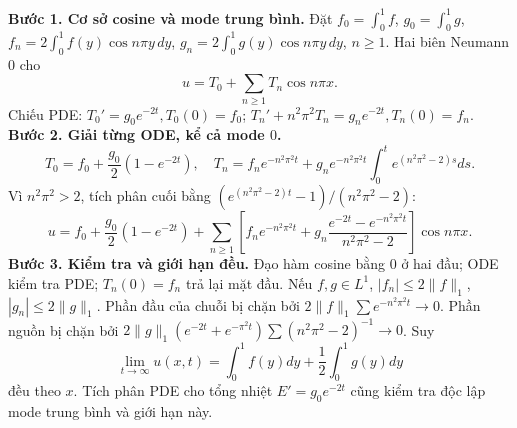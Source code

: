 \textbf{Bước 1. Cơ sở cosine và mode trung bình.}
Đặt $f_0=\int_0^1f$, $g_0=\int_0^1g$, $f_n=2\int_0^1f(y)\cos n\pi y\,dy$, $g_n=2\int_0^1g(y)\cos n\pi y\,dy$, $n\ge1$. Hai biên Neumann $0$ cho
\[u=T_0+\sum_{n\ge1}T_n\cos n\pi x.\]
Chiếu PDE: $T_0'=g_0e^{-2t},T_0(0)=f_0$; $T_n'+n^2\pi^2T_n=g_ne^{-2t},T_n(0)=f_n$.
\textbf{Bước 2. Giải từng ODE, kể cả mode $0$.}
\[T_0=f_0+\frac{g_0}2(1-e^{-2t}),\quad
T_n=f_ne^{-n^2\pi^2t}+g_ne^{-n^2\pi^2t}
\int_0^te^{(n^2\pi^2-2)s}ds.\]
Vì $n^2\pi^2>2$, tích phân cuối bằng $(e^{(n^2\pi^2-2)t}-1)/(n^2\pi^2-2)$:
\[u=f_0+\frac{g_0}2(1-e^{-2t})+
\sum_{n\ge1}\left[f_ne^{-n^2\pi^2t}
+g_n\frac{e^{-2t}-e^{-n^2\pi^2t}}{n^2\pi^2-2}\right]\cos n\pi x.\]
\textbf{Bước 3. Kiểm tra và giới hạn đều.}
Đạo hàm cosine bằng $0$ ở hai đầu; ODE kiểm tra PDE; $T_n(0)=f_n$ trả lại mặt đầu. Nếu $f,g\in L^1$, $|f_n|\le2\|f\|_1$, $|g_n|\le2\|g\|_1$. Phần đầu của chuỗi bị chặn bởi $2\|f\|_1\sum e^{-n^2\pi^2t}\to0$. Phần nguồn bị chặn bởi $2\|g\|_1(e^{-2t}+e^{-\pi^2t})\sum(n^2\pi^2-2)^{-1}\to0$. Suy
\[\lim_{t\to\infty}u(x,t)=\int_0^1f(y)dy+\frac12\int_0^1g(y)dy\]
đều theo $x$. Tích phân PDE cho tổng nhiệt $E'=g_0e^{-2t}$ cũng kiểm tra độc lập mode trung bình và giới hạn này.
